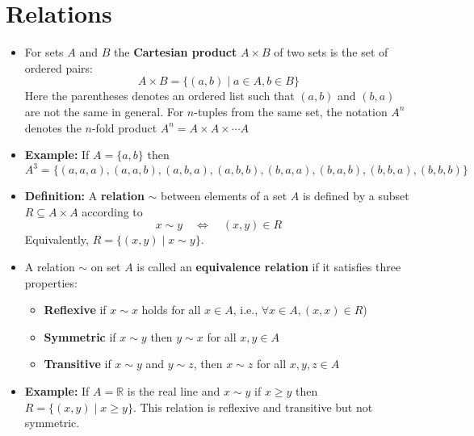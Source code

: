 \documentclass[11pt,twoside]{report}
\newcommand{\bbR}{{\mathbb{R}}}
\begin{document}
\section{Relations}

\begin{itemize}
\item For sets $A$ and $B$ the  \textbf{Cartesian product} $A \times B$ of two sets is the set of ordered pairs:
\[
A \times B = \{ (a,b) \mid a \in A, b \in B\} 
\]
Here the parentheses denotes an ordered list such that $(a,b)$ and $(b,a)$ are not the same in general.  For $n$-tuples from the same set, the notation $A^n$ denotes the $n$-fold product $A^n = A \times A \times \cdots A$

\item \textbf{Example:} If $A = \{ a, b \}$  then 
\[
A^3  = \{ (a,a,a), (a, a, b), (a, b, a), (a, b, b) ,  (b,a,a), (b, a, b), (b, b, a), (b, b, b)  \} 
\]


\item \textbf{Definition:} A \textbf{relation} $\sim$ between elements of a set $A$ is defined by a subset $R \subseteq A \times A $   according to 
\[
x \sim y \quad \iff \quad (x,y) \in R 
\]
Equivalently, $R = \{ (x,y) \mid x \sim y\}$. 


\item A relation $\sim$ on set $A$ is called an \textbf{equivalence relation} if it satisfies three properties: 
\begin{itemize}
  \item \textbf{Reflexive} if $x\sim x$ holds for all $x\in A$, i.e., $\forall x\in A, (x,x) \in R$)
  \item \textbf{Symmetric} if $x\sim y$ then $y\sim x$ for all $x,y\in A$
  \item \textbf{Transitive} if $x\sim y$ and $y\sim z$, then $x\sim z$ for all $x,y,z\in A$
\end{itemize}


\item \textbf{Example:}  If $A = \bbR$ is the real line and $x \sim y$  if $x \ge y$ then  $R = \{ (x,y) \mid x \ge y\}$. This relation is reflexive and transitive but not symmetric. 



\end{itemize}
\end{document}
